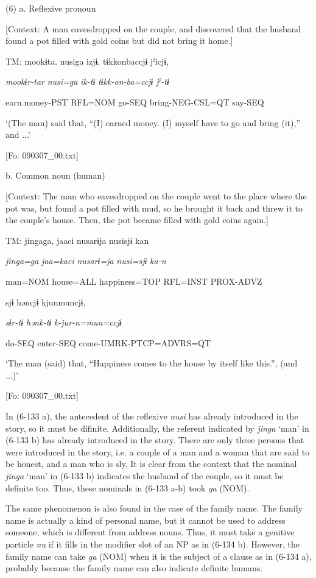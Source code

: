 (6)  a.  Reflexive pronoun

    [Context: A man eavesdropped on the couple, and discovered that the husband found a pot filled with gold coins but did not bring it home.]

    TM:  mookɨta.  nusiga  izjɨ,  tɨkkonbaccjɨ  jˀicjɨ,

      \textit{mookɨr-tar}  \textit{nusi=ga}  \textit{ik-tɨ}  \textit{tɨkk-on-ba=ccjɨ}  \textit{jˀ-tɨ}

      earn.money-PST  RFL=NOM  go-SEQ  bring-NEG-CSL=QT  say-SEQ

      ‘(The man) said that, “(I) earned money. (I) myself have to go and bring (it),” and ...’

      [Fo: 090307\_00.txt]

  b.  Common noun (human)

    [Context: The man who eavesdropped on the couple went to the place where the pot was, but found a pot filled with mud, so he brought it back and threw it to the couple’s house. Then, the pot became filled with gold coins again.]

    TM:  jingaga,  jaaci  nusarɨja  nusisjɨ  kan

      \textit{jinga=ga}  \textit{jaa=kaci}  \textit{nusarɨ=ja}  \textit{nusi=sjɨ}  \textit{ka-n}

      man=NOM  house=ALL  happiness=TOP  RFL=INST  PROX-ADVZ

      sjɨ  həncjɨ  kjunmuncjɨ,

      \textit{sɨr-tɨ}  \textit{hənk-tɨ}  \textit{k-jur-n=mun=ccjɨ}

      do-SEQ  enter-SEQ  come-UMRK-PTCP=ADVRS=QT

      ‘The man (said) that, “Happiness comes to the house by itself like this.”, (and ...)’

      [Fo: 090307\_00.txt]

In (6-133 a), the antecedent of the reflexive \textit{nusi} has already introduced in the story, so it must be difinite. Additionally, the referent indicated by \textit{jinga} ‘man’ in (6-133 b) has already introduced in the story. There are only three persons that were introduced in the story, i.e. a couple of a man and a woman that are said to be honest, and a man who is sly. It is clear from the context that the nominal \textit{jinga} ‘man’ in (6-133 b) indicates the husband of the couple, so it must be definite too. Thus, these nominals in (6-133 a-b) took \textit{ga} (NOM).

The same phenomenon is also found in the case of the family name. The family name is actually a kind of personal name, but it cannot be used to address someone, which is different from address nouns. Thus, it must take a genitive particle \textit{nu} if it fills in the modifier slot of an NP as in (6-134 b). However, the family name can take \textit{ga} (NOM) when it is the subject of a clause as in (6-134 a), probably because the family name can also indicate definite humans.

